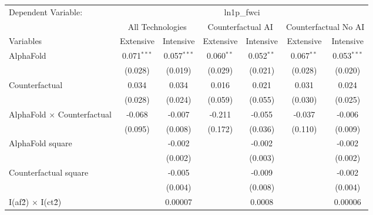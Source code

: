 \begingroup
\centering
\begin{tabular}{lcccccc}
   \tabularnewline \midrule \midrule
   Dependent Variable: & \multicolumn{6}{c}{ln1p\_fwci}\\
 & \multicolumn{2}{c}{All Technologies} & \multicolumn{2}{c}{Counterfactual AI} & \multicolumn{2}{c}{Counterfactual No AI} \\
\cmidrule(lr){1-1}\cmidrule(lr){2-3} \cmidrule(lr){4-5} \cmidrule(lr){6-7}
Variables & \multicolumn{1}{c}{Extensive} & \multicolumn{1}{c}{Intensive} & \multicolumn{1}{c}{Extensive} & \multicolumn{1}{c}{Intensive} & \multicolumn{1}{c}{Extensive} & \multicolumn{1}{c}{Intensive} \\
\cmidrule(lr){1-1}\cmidrule(lr){2-2} \cmidrule(lr){3-3} \cmidrule(lr){4-4} \cmidrule(lr){5-5} \cmidrule(lr){6-6} \cmidrule(lr){7-7}
   AlphaFold                          & 0.071$^{***}$ & 0.057$^{***}$ & 0.060$^{**}$ & 0.052$^{**}$ & 0.067$^{**}$ & 0.053$^{***}$\\   
                                      & (0.028)       & (0.019)       & (0.029)      & (0.021)      & (0.028)      & (0.020)\\   
   Counterfactual                     & 0.034         & 0.034         & 0.016        & 0.021        & 0.031        & 0.024\\   
                                      & (0.028)       & (0.024)       & (0.059)      & (0.055)      & (0.030)      & (0.025)\\   
   AlphaFold $\times$ Counterfactual  & -0.068        & -0.007        & -0.211       & -0.055       & -0.037       & -0.006\\   
                                      & (0.095)       & (0.008)       & (0.172)      & (0.036)      & (0.110)      & (0.009)\\   
   AlphaFold square                   &               & -0.002        &              & -0.002       &              & -0.002\\   
                                      &               & (0.002)       &              & (0.003)      &              & (0.002)\\   
   Counterfactual square              &               & -0.005        &              & -0.009       &              & -0.002\\   
                                      &               & (0.004)       &              & (0.008)      &              & (0.004)\\   
   I(af\^2) $\times$ I(ct\^2)         &               & 0.00007       &              & 0.0008       &              & 0.00006\\   

\end{tabular}

